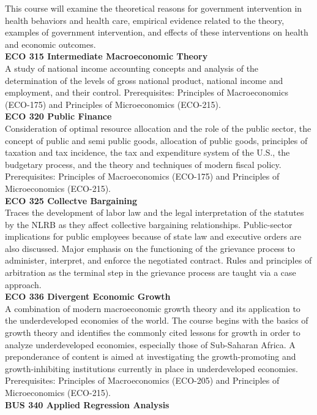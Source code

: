 \documentclass[
  letterpaper,
]{scrbook}
\begin{document}
This course will examine the theoretical reasons for government
intervention in health behaviors and health care, empirical evidence
related to the theory, examples of government intervention, and effects
of these interventions on health and economic outcomes.\\
\textbf{ECO 315 Intermediate Macroeconomic Theory}\\
A study of national income accounting concepts and analysis of the
determination of the levels of gross national product, national income
and employment, and their control. Prerequisites: Principles of
Macroeconomics (ECO-175) and Principles of Microeconomics (ECO-215).\\
\textbf{ECO 320 Public Finance}\\
Consideration of optimal resource allocation and the role of the public
sector, the concept of public and semi public goods, allocation of
public goods, principles of taxation and tax incidence, the tax and
expenditure system of the U.S., the budgetary process, and the theory
and techniques of modern fiscal policy. Prerequisites: Principles of
Macroeconomics (ECO-175) and Principles of Microeconomics (ECO-215).\\
\textbf{ECO 325 Collectve Bargaining}\\
Traces the development of labor law and the legal interpretation of the
statutes by the NLRB as they affect collective bargaining relationships.
Public-sector implications for public employees because of state law and
executive orders are also discussed. Major emphasis on the functioning
of the grievance process to administer, interpret, and enforce the
negotiated contract. Rules and principles of arbitration as the terminal
step in the grievance process are taught via a case approach.\\
\textbf{ECO 336 Divergent Economic Growth}\\
A combination of modern macroeconomic growth theory and its application
to the underdeveloped economies of the world. The course begins with the
basics of growth theory and identifies the commonly cited lessons for
growth in order to analyze underdeveloped economies, especially those of
Sub-Saharan Africa. A preponderance of content is aimed at investigating
the growth-promoting and growth-inhibiting institutions currently in
place in underdeveloped economies. Prerequisites: Principles of
Macroeconomics (ECO-205) and Principles of Microeconomics (ECO-215).\\
\textbf{BUS 340 Applied Regression Analysis}\\
\end{document}

